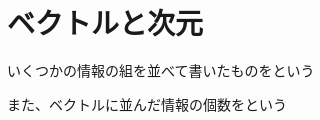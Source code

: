 \documentclass[../../../topic_vector]{subfiles}
\begin{document}
\sectionline
\section{ベクトルと次元}

いくつかの情報の組を並べて書いたものをという

また、ベクトルに並んだ情報の個数をという
\end{document}
